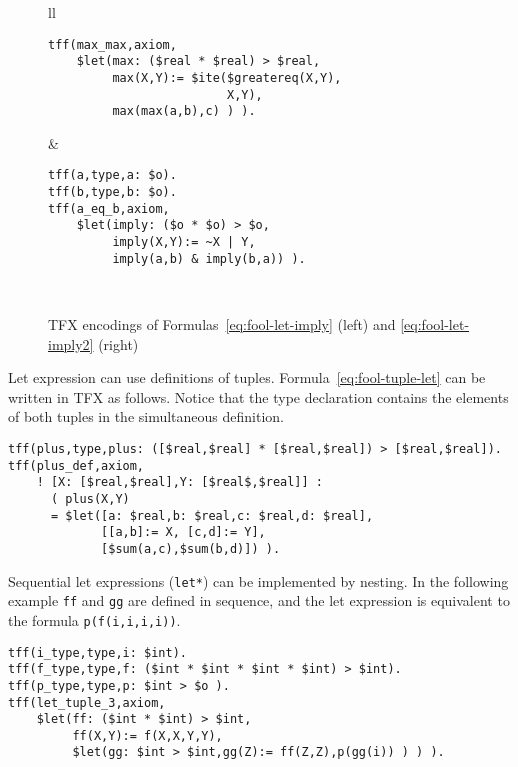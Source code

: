 \documentclass{easychair}
\begin{document}
\begin{figure}[htbp]
\begin{tabular}[t]{ll}
\begin{minipage}{0.52\textwidth}
\begin{verbatim}
tff(max_max,axiom,
    $let(max: ($real * $real) > $real,
         max(X,Y):= $ite($greatereq(X,Y),
                         X,Y),
         max(max(a,b),c) ) ).
\end{verbatim}
\end{minipage}
  &
\begin{minipage}{0.48\textwidth}
\begin{verbatim}
tff(a,type,a: $o).
tff(b,type,b: $o).
tff(a_eq_b,axiom,
    $let(imply: ($o * $o) > $o,
         imply(X,Y):= ~X | Y,
         imply(a,b) & imply(b,a)) ).
\end{verbatim}
\end{minipage}
\\
\end{tabular}
\caption{TFX encodings of Formulas~\ref{eq:fool-let-imply} (left) and \ref{eq:fool-let-imply2} (right)}
\label{fig:let-tfx}
\end{figure}

Let expression can use definitions of tuples. 
Formula~\ref{eq:fool-tuple-let} can be written in TFX as follows. 
Notice that the type declaration contains the elements of both tuples in 
the simultaneous definition.
\begin{verbatim}
tff(plus,type,plus: ([$real,$real] * [$real,$real]) > [$real,$real]).
tff(plus_def,axiom,
    ! [X: [$real,$real],Y: [$real$,$real]] :
      ( plus(X,Y) 
      = $let([a: $real,b: $real,c: $real,d: $real],
             [[a,b]:= X, [c,d]:= Y],
             [$sum(a,c),$sum(b,d)]) ).
\end{verbatim}

Sequential let expressions (\verb'let*') can be implemented by nesting. 
In the following example {\tt ff} and {\tt gg} are defined in sequence, and the let expression is equivalent to the formula \verb'p(f(i,i,i,i))'.
\begin{verbatim}
tff(i_type,type,i: $int).
tff(f_type,type,f: ($int * $int * $int * $int) > $int).
tff(p_type,type,p: $int > $o ).
tff(let_tuple_3,axiom,
    $let(ff: ($int * $int) > $int,
         ff(X,Y):= f(X,X,Y,Y),
         $let(gg: $int > $int,gg(Z):= ff(Z,Z),p(gg(i)) ) ) ).
\end{verbatim}
\end{document}
